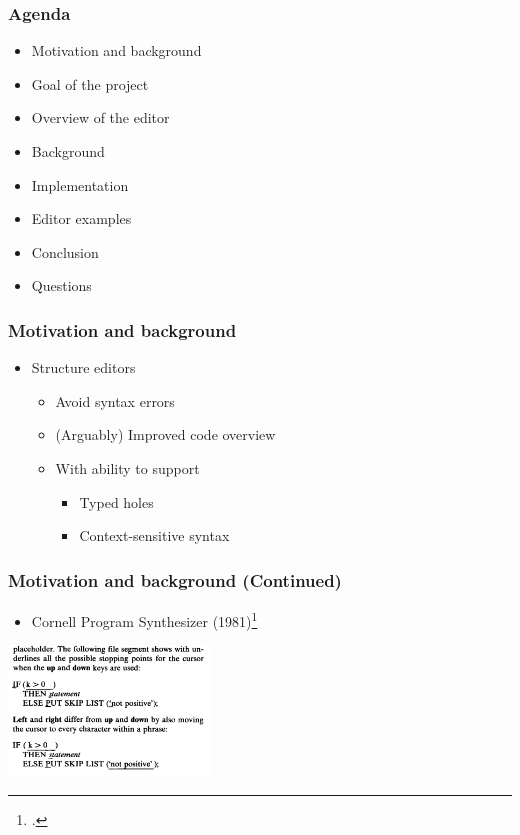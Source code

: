 \documentclass[t,24pt,aspectratio=169]{beamer}
\begin{document}
\begin{frame}[hvid]
    \frametitle{Agenda}

    \begin{itemize}
        \item Motivation and background
        \item Goal of the project
        \item Overview of the editor
        \item Background
        \item Implementation
        \item Editor examples
        \item Conclusion
        \item Questions
    \end{itemize}
\end{frame}

\begin{frame}[hvid]
    \frametitle{Motivation and background}
    \begin{itemize}
        \item Structure editors
              \begin{itemize}
                  \item Avoid syntax errors
                  \item (Arguably) Improved code overview
                  \item With ability to support
                        \begin{itemize}
                            \item Typed holes
                            \item Context-sensitive syntax
                        \end{itemize}
              \end{itemize}
    \end{itemize}
\end{frame}

\begin{frame}[hvid]
    \frametitle{Motivation and background (Continued)}

    \begin{multicols}{2}
        \begin{itemize}
            \item Cornell Program Synthesizer (1981)\footcite{timtom81}

        \end{itemize}
        \vfill\null
        \columnbreak
        \includegraphics[width=0.4\textwidth]{img/cornell-ex.png}
    \end{multicols}
\end{frame}
\end{document}
